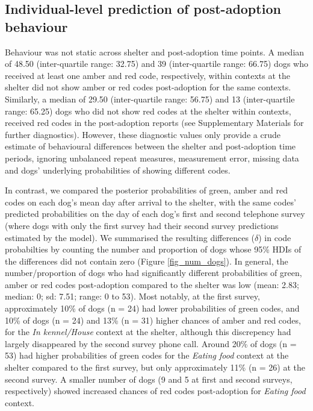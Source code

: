 \documentclass[12pt]{article}
\begin{document}
\subsection{Individual-level prediction of post-adoption behaviour}
Behaviour was not static across shelter and post-adoption time points. A median of 48.50 (inter-quartile range: 32.75) and 39 (inter-quartile range: 66.75) dogs who received at least one amber and red code, respectively, within contexts at the shelter did not show amber or red codes post-adoption for the same contexts. Similarly, a median of 29.50 (inter-quartile range: 56.75) and 13 (inter-quartile range: 65.25) dogs who did not show red codes at the shelter within contexts, received red codes in the post-adoption reports (see Supplementary Materials for further diagnostics). However, these diagnostic values only provide a crude estimate of behavioural differences between the shelter and post-adoption time periods, ignoring unbalanced repeat measures, measurement error, missing data and dogs' underlying probabilities of showing different codes.

In contrast, we compared the posterior probabilities of green, amber and red codes on each dog's mean day after arrival to the shelter, with the same codes' predicted probabilities on the day of each dog's first and second telephone survey (where dogs with only the first survey had their second survey predictions estimated by the model). We summarised the resulting differences ($\delta$) in code probabilties by counting the number and proportion of dogs whose 95\% HDIs of the differences did not contain zero (Figure \ref{fig_num_dogs}). In general, the number/proportion of dogs who had significantly different probabilities of green, amber or red codes post-adoption compared to the shelter was low (mean: 2.83; median: 0; sd: 7.51; range: 0 to 53). Most notably, at the first survey, approximately 10\% of dogs (n = 24) had lower probabilities of green codes, and 10\% of dogs (n = 24) and 13\% (n = 31) higher chances of amber and red codes, for the \textit{In kennel/House} context at the shelter, although this discrepency had largely disappeared by the second survey phone call. Around 20\% of dogs (n = 53) had higher probabilities of green codes for the \textit{Eating food} context at the shelter compared to the first survey, but only approximately 11\% (n = 26) at the second survey. A smaller number of dogs (9 and 5 at first and second surveys, respectively) showed increased chances of red codes post-adoption for \textit{Eating food} context.
\end{document}
